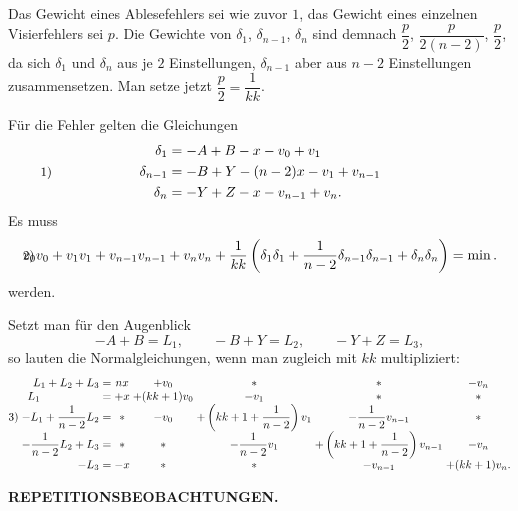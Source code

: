 Das Gewicht eines Ablesefehlers sei wie zuvor $1$, das Gewicht eines einzelnen Visierfehlers sei $p$. Die Gewichte von $\delta_1$, $\delta_{n-1}$, $\delta_n$ sind demnach $\dfrac{p}{2}$, $\dfrac{p}{2(n-2)}$, $\dfrac{p}{2}$, da sich $\delta_1$ und $\delta_n$ aus je $2$ Einstellungen, $\delta_{n-1}$ aber aus $n-2$ Einstellungen zusammensetzen. Man setze jetzt $\dfrac{p}{2}=\dfrac{1}{kk}$.

Für die Fehler gelten die Gleichungen
\[
\makebox[\linewidth]{\hspace*{\parindent}\makebox[0pt][l]{\small 1)}\hfill
\(\displaystyle
 \begin{aligned}
  \delta_1 &= -A+B-x-v_0+v_1\\
  \delta_{n-1} &= -B+Y-(n-2)x-v_1+v_{n-1}\\
  \delta_n &= -Y+Z-x-v_{n-1}+v_n.
 \end{aligned}
\)\hfill\hspace*{\parindent}}
\]
\indent Es muss
\[
\makebox[\linewidth]{\hspace*{\parindent}\makebox[0pt][l]{\small 2)}\hfill
\(\displaystyle
 v_0v_0+v_1v_1+v_{n-1}v_{n-1}+v_nv_n+
 \frac{1}{kk}\left(\delta_1\delta_1+
 \frac{1}{n-2}\delta_{n-1}\delta_{n-1}+\delta_n\delta_n\right)=\min.
\)\hfill\hspace*{\parindent}}
\]
werden.

Setzt man für den Augenblick
\[
 -A+B=L_1,\qquad -B+Y=L_2,\qquad -Y+Z=L_3,
\]
so lauten die Normalgleichungen, wenn man zugleich mit $kk$ multipliziert:
{\small
\[
\begin{array}{@{}l@{\;}r@{\;}c@{\;}c@{\;}c@{\;}c@{\;}c@{\;}c@{}}
 & L_1+L_2+L_3 &=& nx & +v_0 & * & * & -v_n\\
 & \multicolumn{1}{l@{\;}}{L_1} &=& +x & +(kk+1)v_0 & -v_1 & * & *\\
 \text{3)} & -L_1+\dfrac{1}{n-2}L_2 &=& * & -v_0 &
  +\left(kk+1+\dfrac{1}{n-2}\right)v_1 & -\dfrac{1}{n-2}v_{n-1} & *\\[3pt]
 & -\dfrac{1}{n-2}L_2+L_3 &=& * & * &
  -\dfrac{1}{n-2}v_1 & +\left(kk+1+\dfrac{1}{n-2}\right)v_{n-1} & -v_n\\[3pt]
 & -L_3 &=& -x & * & * & -v_{n-1} & +(kk+1)v_n.
\end{array}
\]
}

\par\clearpage
\noindent\null\hfill{\small\textbf{REPETITIONSBEOBACHTUNGEN.}}\hfill{}\par\medskip

